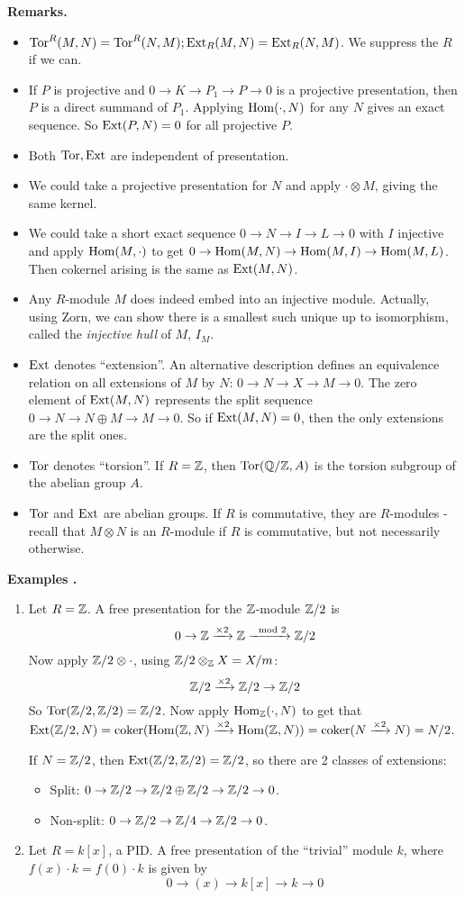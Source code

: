 \documentclass[10pt,a4paper]{article}
\begin{document}
\textbf{Remarks.}
\begin{itemize}
  \item $\operatorname{Tor}^R(M,N) = \operatorname{Tor}^R(N,M); \operatorname{Ext}_R(M,N) = \operatorname{Ext}_R(N,M)$. We suppress the $R$ if we can.
  \item If $P$ is projective and $0 \to K \to P_1 \to P \to 0$ is a projective presentation, then $P$ is a direct summand of $P_1$. Applying $\operatorname{Hom}(\cdot, N)$ for any $N$ gives an exact sequence. So $\operatorname{Ext}(P, N) = 0$ for all projective $P$.
  \item Both $\operatorname{Tor}, \operatorname{Ext}$ are independent of presentation.
  \item We could take a projective presentation for $N$ and apply $\cdot \otimes M$, giving the same kernel.
  \item We could take a short exact sequence $0 \to N \to I \to L\to 0$ with $I$ injective and apply $\operatorname{Hom}(M, \cdot)$ to get $0 \to \operatorname{Hom}(M,N) \to \operatorname{Hom}(M,I) \to \operatorname{Hom}(M,L)$. Then cokernel arising is the same as $\operatorname{Ext}(M,N)$.
  \item Any $R$-module $M$ does indeed embed into an injective module. Actually, using Zorn, we can show there is a smallest such unique up to isomorphism, called the \emph{injective hull} of $M$, $I_M$.
  \item $\operatorname{Ext}$ denotes ``extension''. An alternative description defines an equivalence relation on all extensions of $M$ by $N$: $0 \to N \to X \to M\to 0$. The zero element of $\operatorname{Ext}(M,N)$ represents the split sequence $0 \to N \to N \oplus M \to M \to 0$. So if $\operatorname{Ext}(M,N) = 0$, then the only extensions are the split ones.
  \item $\operatorname{Tor}$ denotes ``torsion''. If $R = \mathbb{Z}$, then $\operatorname{Tor}(\mathbb{Q}/\mathbb{Z}, A)$ is the torsion subgroup of the abelian group $A$.
  \item $\operatorname{Tor}$ and $\operatorname{Ext}$ are abelian groups. If $R$ is commutative, they are $R$-modules - recall that $M \otimes N$ is an $R$-module if $R$ is commutative, but not necessarily otherwise.
\end{itemize}
\textbf{Examples \thetheorem.}
\begin{enumerate}
  \item Let $R = \mathbb{Z}$. A free presentation for the $\mathbb{Z}$-module $\mathbb{Z}/2$ is
  \[0 \to \mathbb{Z} \xrightarrow{\times 2} \mathbb{Z} \xrightarrow{\mod 2} \mathbb{Z}/2\]
  Now apply $\mathbb{Z}/2 \otimes \cdot$, using $\mathbb{Z}/2 \otimes_{\mathbb{Z}} X = X/m$:
  \[\mathbb{Z}/2 \xrightarrow{\times 2} \mathbb{Z}/2 \to \mathbb{Z}/2\]
  So $\operatorname{Tor}(\mathbb{Z}/2, \mathbb{Z}/2) = \mathbb{Z}/2$. Now apply $\operatorname{Hom}_{\mathbb{Z}}(\cdot, N)$ to get that $\operatorname{Ext}(\mathbb{Z}/2, N) = \operatorname{coker}(\operatorname{Hom}(\mathbb{Z}, N)\xrightarrow{\times 2}\operatorname{Hom}(\mathbb{Z}, N)) = \operatorname{coker}(N \xrightarrow{\times 2} N) = N/2$.

  If $N = \mathbb{Z}/2$, then $\operatorname{Ext}(\mathbb{Z}/2, \mathbb{Z}/2) = \mathbb{Z}/2$, so there are 2 classes of extensions:
  \begin{itemize}
    \item Split: $0 \to \mathbb{Z}/2 \to \mathbb{Z}/2 \oplus \mathbb{Z}/2 \to \mathbb{Z}/2 \to 0$.
    \item Non-split: $0 \to \mathbb{Z}/2 \to \mathbb{Z}/4 \to \mathbb{Z}/2 \to 0$.
  \end{itemize}
  \item Let $R = k[x]$, a PID. A free presentation of the ``trivial'' module $k$, where $f(x)\cdot k = f(0)\cdot k$ is given by
  \[0 \to (x) \to k[x] \to k \to 0\]
\end{enumerate}
\end{document}
